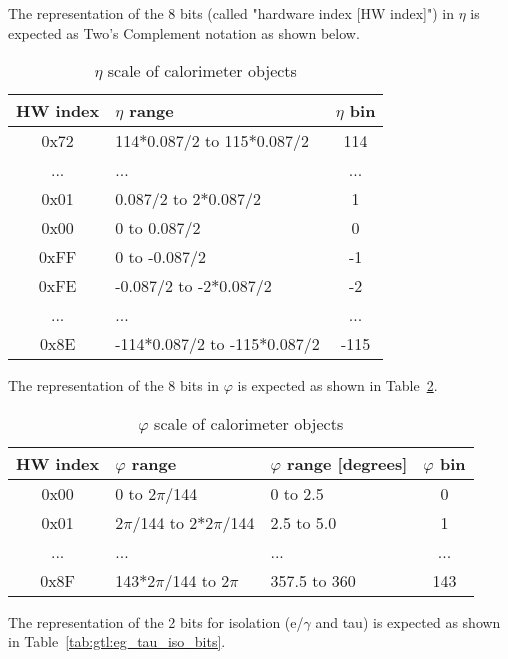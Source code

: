 The representation of the 8 bits (called "hardware index [HW index]") in $\eta$ is expected as Two's Complement notation as shown below.\\

\begin{table}[ht]
\caption{$\eta$ scale of calorimeter objects}
\vspace{5mm}
\centering
\begin{tabular}{|c|l|c|}\hline
\textbf{HW index}& \textbf{$\eta$ range} & \textbf{$\eta$ bin}\\\hline\hline
0x72 & 114$*$0.087/2 to 115$*$0.087/2 & 114\\\hline
... & ... & ...\\\hline
0x01 & 0.087/2 to 2$*$0.087/2 & 1\\\hline
0x00 & 0 to 0.087/2 & 0\\\hline
0xFF & 0 to -0.087/2 & -1\\\hline
0xFE & -0.087/2 to -2$*$0.087/2 & -2\\\hline
... & ... & ...\\\hline
0x8E & -114$*$0.087/2 to -115$*$0.087/2 & -115\\\hline
\end{tabular}
\label{tab:gtl:calo_eta_scale_new}
\end{table}

The representation of the 8 bits in $\varphi$ is expected as shown in Table~\ref{tab:gtl:calo_phi_scale}.\\

\begin{table}[ht]
\caption{$\varphi$ scale of calorimeter objects}
\vspace{5mm}
\centering
\begin{tabular}{|c|l|l|c|}\hline
HW index & $\varphi$ range & $\varphi$ range [degrees] & $\varphi$ bin\\\hline\hline
0x00 & 0 to 2$\pi$/144 & 0 to 2.5 & 0\\\hline
0x01 & 2$\pi$/144 to 2$*$2$\pi$/144 & 2.5 to 5.0 & 1\\\hline
... & ... & ... & ...\\\hline
0x8F & 143$*$2$\pi$/144 to 2$\pi$ & 357.5 to 360 & 143\\\hline
\end{tabular}
\label{tab:gtl:calo_phi_scale}
\end{table}

The representation of the 2 bits for isolation (e/$\gamma$ and tau) is expected as shown in Table~\ref{tab:gtl:eg_tau_iso_bits}.\\

